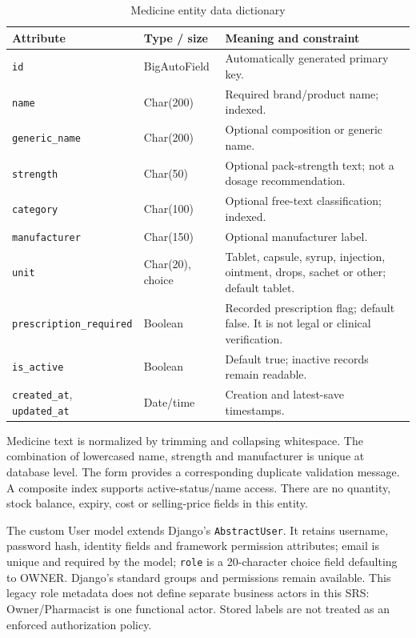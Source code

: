 \documentclass[11pt,a4paper]{article}
\begin{document}
\begin{table}[H]
\centering\small
\caption{Medicine entity data dictionary}
\begin{tabularx}{\textwidth}{L{46mm}L{28mm}Y}
\toprule Attribute & Type / size & Meaning and constraint\\\midrule
\texttt{id} & BigAutoField & Automatically generated primary key.\\
\texttt{name} & Char(200) & Required brand/product name; indexed.\\
\texttt{generic\_name} & Char(200) & Optional composition or generic name.\\
\texttt{strength} & Char(50) & Optional pack-strength text; not a dosage recommendation.\\
\texttt{category} & Char(100) & Optional free-text classification; indexed.\\
\texttt{manufacturer} & Char(150) & Optional manufacturer label.\\
\texttt{unit} & Char(20), choice & Tablet, capsule, syrup, injection, ointment, drops, sachet or other; default tablet.\\
\texttt{prescription\_required} & Boolean & Recorded prescription flag; default false. It is not legal or clinical verification.\\
\texttt{is\_active} & Boolean & Default true; inactive records remain readable.\\
\texttt{created\_at}, \texttt{updated\_at} & Date/time & Creation and latest-save timestamps.\\
\bottomrule
\end{tabularx}
\end{table}
Medicine text is normalized by trimming and collapsing whitespace. The combination of lowercased name, strength and manufacturer is unique at database level. The form provides a corresponding duplicate validation message. A composite index supports active-status/name access. There are no quantity, stock balance, expiry, cost or selling-price fields in this entity.

The custom User model extends Django's \texttt{AbstractUser}. It retains username, password hash, identity fields and framework permission attributes; email is unique and required by the model; \texttt{role} is a 20-character choice field defaulting to OWNER. Django's standard groups and permissions remain available. This legacy role metadata does not define separate business actors in this SRS: Owner/Pharmacist is one functional actor. Stored labels are not treated as an enforced authorization policy.
\end{document}
